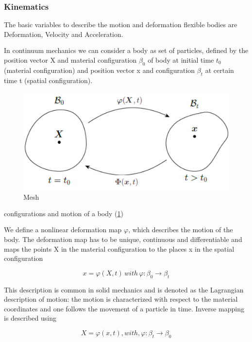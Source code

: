 \subsubsection{Kinematics \citep{FEM}}

The basic variables to describe the motion and deformation flexible
bodies are Deformation, Velocity and Acceleration. 

In continuum mechanics we can consider a body as set of particles,
defined by the position vector X and material configuration $\beta_{0}$
of body at initial time $t_{0}$ (material configuration)
and position vector x and configuration $\beta_{t}$
at certain time t (spatial configuration).

\begin{figure}[H]
    \centering
	\includegraphics[scale=0.075]{../images/potato.png}
	\caption{Mesh}
	\label{fig:potato}
\end{figure}

configurations and motion of a body (\ref{fig:potato})

We define a nonlinear deformation map $\varphi$, which describes
the motion of the body. The deformation map has to be unique, continuous
and differentiable and maps the points X in the material configuration
to the places x in the spatial configuration 

\begin{equation}
x=\varphi(X,t)\,with\,\varphi\colon\beta_{0}\rightarrow\beta_{t}
\end{equation}


This description is common in solid mechanics and is denoted as the
Lagrangian description of motion: the motion is characterized with
respect to the material coordinates and one follows the movement of
a particle in time. Inverse mapping is described using 

\begin{equation}
X=\varphi(x,t) , with, \varphi: \beta_{t}\rightarrow\beta_{0}
\end{equation}


